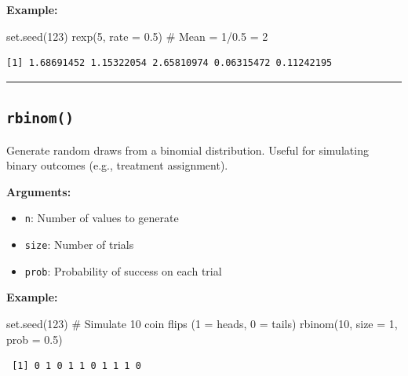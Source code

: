 \documentclass[
  letterpaper,
  DIV=11,
  numbers=noendperiod]{scrreprt}
\newenvironment{Shaded}{\begin{snugshade}}{\end{snugshade}}
\newcommand{\AttributeTok}[1]{\textcolor[rgb]{0.40,0.45,0.13}{#1}}
\newcommand{\CommentTok}[1]{\textcolor[rgb]{0.37,0.37,0.37}{#1}}
\newcommand{\DecValTok}[1]{\textcolor[rgb]{0.68,0.00,0.00}{#1}}
\newcommand{\FloatTok}[1]{\textcolor[rgb]{0.68,0.00,0.00}{#1}}
\newcommand{\FunctionTok}[1]{\textcolor[rgb]{0.28,0.35,0.67}{#1}}
\newcommand{\NormalTok}[1]{\textcolor[rgb]{0.00,0.23,0.31}{#1}}
\providecommand{\tightlist}{%
  \setlength{\itemsep}{0pt}\setlength{\parskip}{0pt}}
\begin{document}
\textbf{Example:}

\begin{Shaded}
\begin{Highlighting}[]
\FunctionTok{set.seed}\NormalTok{(}\DecValTok{123}\NormalTok{)}
\FunctionTok{rexp}\NormalTok{(}\DecValTok{5}\NormalTok{, }\AttributeTok{rate =} \FloatTok{0.5}\NormalTok{)  }\CommentTok{\# Mean = 1/0.5 = 2}
\end{Highlighting}
\end{Shaded}

\begin{verbatim}
[1] 1.68691452 1.15322054 2.65810974 0.06315472 0.11242195
\end{verbatim}

\begin{center}\rule{0.5\linewidth}{0.5pt}\end{center}

\subsection{\texorpdfstring{\texttt{rbinom()}}{rbinom()}}\label{rbinom}

Generate random draws from a binomial distribution. Useful for
simulating binary outcomes (e.g., treatment assignment).

\textbf{Arguments:}

\begin{itemize}
\tightlist
\item
  \texttt{n}: Number of values to generate
\item
  \texttt{size}: Number of trials
\item
  \texttt{prob}: Probability of success on each trial
\end{itemize}

\textbf{Example:}

\begin{Shaded}
\begin{Highlighting}[]
\FunctionTok{set.seed}\NormalTok{(}\DecValTok{123}\NormalTok{)}
\CommentTok{\# Simulate 10 coin flips (1 = heads, 0 = tails)}
\FunctionTok{rbinom}\NormalTok{(}\DecValTok{10}\NormalTok{, }\AttributeTok{size =} \DecValTok{1}\NormalTok{, }\AttributeTok{prob =} \FloatTok{0.5}\NormalTok{)}
\end{Highlighting}
\end{Shaded}

\begin{verbatim}
 [1] 0 1 0 1 1 0 1 1 1 0
\end{verbatim}
\end{document}
